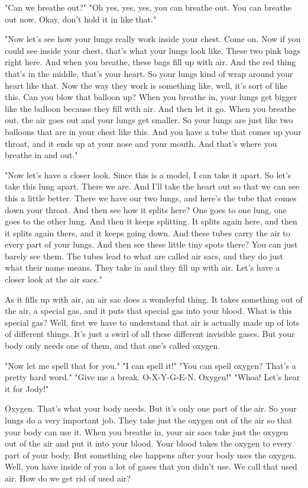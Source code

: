 "Can we breathe out?"
"Oh yes, yes, yes, you can breathe out. You can breathe out now. Okay, don't hold it in like that."

"Now let's see how your lungs really work inside your chest. Come on. Now if you could see inside your chest, that's what your lungs look like. These two pink bags right here. And when you breathe, these bags fill up with air. And the red thing that's in the middle, that's your heart. So your lungs kind of wrap around your heart like that. Now the way they work is something like, well, it's sort of like this. Can you blow that balloon up? When you breathe in, your lungs get bigger like the balloon because they fill with air. And then let it go. When you breathe out, the air goes out and your lungs get smaller. So your lungs are just like two balloons that are in your chest like this. And you have a tube that comes up your throat, and it ends up at your nose and your mouth. And that's where you breathe in and out."

"Now let's have a closer look. Since this is a model, I can take it apart. So let's take this lung apart. There we are. And I'll take the heart out so that we can see this a little better. There we have our two lungs, and here's the tube that comes down your throat. And then see how it splits here? One goes to one lung, one goes to the other lung. And then it keeps splitting. It splits again here, and then it splits again there, and it keeps going down. And these tubes carry the air to every part of your lungs. And then see these little tiny spots there? You can just barely see them. The tubes lead to what are called air sacs, and they do just what their name means. They take in and they fill up with air. Let's have a closer look at the air sacs."

As it fills up with air, an air sac does a wonderful thing. It takes something out of the air, a special gas, and it puts that special gas into your blood. What is this special gas? Well, first we have to understand that air is actually made up of lots of different things. It's just a swirl of all these different invisible gases. But your body only needs one of them, and that one's called oxygen.

"Now let me spell that for you."
"I can spell it!"
"You can spell oxygen? That's a pretty hard word."
"Give me a break. O-X-Y-G-E-N. Oxygen!"
"Whoa! Let's hear it for Jody!"

Oxygen. That's what your body needs. But it's only one part of the air. So your lungs do a very important job. They take just the oxygen out of the air so that your body can use it. When you breathe in, your air sacs take just the oxygen out of the air and put it into your blood. Your blood takes the oxygen to every part of your body. But something else happens after your body uses the oxygen. Well, you have inside of you a lot of gases that you didn't use. We call that used air. How do we get rid of used air?

